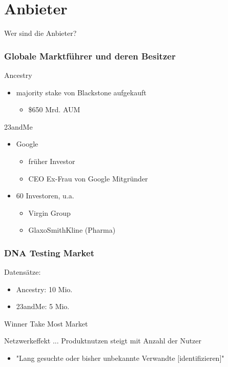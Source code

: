 \documentclass{beamer}
\begin{document}
\section{Anbieter}
\begin{frame}
  \begin{center}
    {\Huge Wer sind die Anbieter?}
  \end{center}
\end{frame}

\begin{frame}
  \frametitle{Globale Marktführer und deren Besitzer}

  Ancestry
  \begin{itemize}
    \item majority stake von Blackstone aufgekauft\autocite{Ancwiki}
      \begin{itemize}
        \item \$650 Mrd. AUM\autocite{blackstone}
      \end{itemize}
  \end{itemize}

  23andMe
  \begin{itemize}
    \item Google\autocite{23wiki}
      \begin{itemize}
        \item früher Investor
        \item CEO Ex-Frau von Google Mitgründer
    \end{itemize}
    \item 60 Investoren, u.a.\autocite{23owners}
      \begin{itemize}
        \item Virgin Group
        \item GlaxoSmithKline (Pharma)
      \end{itemize}
  \end{itemize}
\end{frame}

\begin{frame}[allowframebreaks]
  \frametitle{DNA Testing Market}
  Datensätze:\autocite{ancestryGER}
  \begin{itemize}
    \item Ancestry: 10 Mio.
    \item 23andMe: 5 Mio.
  \end{itemize}

  \break

  Winner Take Most Market

  \bigskip

  Netzwerkeffekt ... Produktnutzen steigt mit Anzahl der Nutzer

  \medskip

  \begin{itemize}
    \item "Lang gesuchte oder bisher unbekannte Verwandte [identifizieren]"\autocite{ancestryBlog}
  \end{itemize}
\end{frame}
\end{document}
